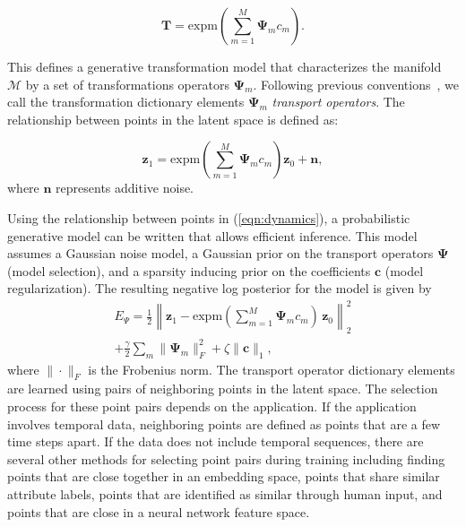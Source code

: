 \documentclass[letterpaper]{article} %
\newcommand{\mtx}[1]{\ensuremath{\mathbf{#1}}}
\newcommand{\vtr}[1]{\ensuremath{\mathbf{#1}}}
\begin{document}
\begin{equation}
    \mtx{T} = \mathrm{expm}\left(\sum_{m=1}^M{\mtx{\Psi}_mc_m}\right).
\end{equation}

This defines a generative transformation model that characterizes the manifold $\mathcal{M}$ by a set of transformations operators $\mtx{\Psi}_m$. Following previous conventions~\cite{culpepper2009learning}, we call the transformation dictionary elements $\mtx{\Psi}_m$ \textit{transport operators}. The relationship between points in the latent space is defined as:

\begin{equation}
\vtr{z}_1 = \mathrm{expm}\left(\sum_{m=1}^M{\mtx{\Psi}_mc_m}\right)\vtr{z}_0 + \vtr{n}, \label{eqn:dynamics}
\end{equation}
where $\vtr{n}$ represents additive noise.

Using the relationship between points in (\ref{eqn:dynamics}), a probabilistic generative model can be written that allows efficient inference. This model assumes a Gaussian noise model, a Gaussian prior on the transport operators $\mtx{\Psi}$ (model selection), and a sparsity inducing prior on the coefficients $\vtr{c}$ (model regularization).  The resulting negative log posterior for the model is given by
\begin{equation} \label{eq:objFun}
\begin{split}
E_{\Psi} = \frac{1}{2}\left\|\vtr{z}_1 - \mathrm{expm}\left(\sum_{m=1}^M{\mtx{\Psi}_mc_m} \right) \, \vtr{z}_0\right\|_2^2 \\
+ \frac{\gamma}{2}\sum_m\|\mtx{\Psi}_m\|_F^2 +\zeta\|\vtr{c}\|_1,
\end{split}
\end{equation}
where $\|\cdot\|_F$ is the Frobenius norm. The transport operator dictionary elements are learned using pairs of neighboring points in the latent space. The selection process for these point pairs depends on the application. If the application involves temporal data, neighboring points are defined as points that are a few time steps apart. If the data does not include temporal sequences, there are several other methods for selecting point pairs during training including finding points that are close together in an embedding space, points that share similar attribute labels, points that are identified as similar through human input, and points that are close in a neural network feature space.
\end{document}
